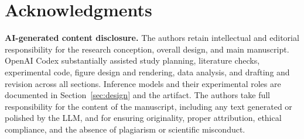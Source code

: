 \section*{Acknowledgments}
\textbf{AI-generated content disclosure.} The authors retain intellectual and editorial responsibility for the research conception, overall design, and main manuscript. OpenAI Codex substantially assisted study planning, literature checks, experimental code, figure design and rendering, data analysis, and drafting and revision across all sections. Inference models and their experimental roles are documented in Section~\ref{sec:design} and the artifact. The authors take full responsibility for the content of the manuscript, including any text generated or polished by the LLM, and for ensuring originality, proper attribution, ethical compliance, and the absence of plagiarism or scientific misconduct.
